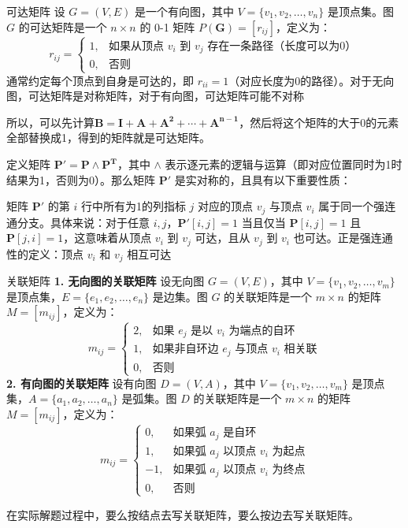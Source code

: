 \documentclass[lang=cn,11pt]{elegantbook}
\begin{document}
\begin{definition}{可达矩阵}
设 $G = (V, E)$ 是一个有向图，其中 $V = \{v_1, v_2, \ldots, v_n\}$ 是顶点集。图 $G$ 的可达矩阵是一个 $n \times n$ 的 0-1 矩阵 $P(\bm{G}) = [r_{ij}]$，定义为：
\[
r_{ij} = 
\begin{cases}
1, & \text{如果从顶点 } v_i \text{ 到 } v_j \text{ 存在一条路径（长度可以为0）} \\
0, & \text{否则}
\end{cases}
\]
通常约定每个顶点到自身是可达的，即 $r_{ii} = 1$（对应长度为0的路径）。对于无向图，可达矩阵是对称矩阵，对于有向图，可达矩阵可能不对称
\end{definition}
所以，可以先计算$\bm{B}=\bm{I}+\bm{A}+\bm{A^2}+\cdots+\bm{A^{n-1}}$，然后将这个矩阵的大于0的元素全部替换成1，得到的矩阵就是可达矩阵。

定义矩阵 $\bm{P'} = \bm{P} \land \bm{P^T}$，其中 $\land$ 表示逐元素的逻辑与运算（即对应位置同时为1时结果为1，否则为0）。那么矩阵 $\bm{P'}$ 是实对称的，且具有以下重要性质：

矩阵 $\bm{P'}$ 的第 $i$ 行中所有为1的列指标 $j$ 对应的顶点 $v_j$ 与顶点 $v_i$ 属于同一个强连通分支。具体来说：对于任意 $i,j$，$\bm{P'}[i,j] = 1$ 当且仅当 $\bm{P}[i,j] = 1$ 且 $\bm{P}[j,i] = 1$，这意味着从顶点 $v_i$ 到 $v_j$ 可达，且从 $v_j$ 到 $v_i$ 也可达。正是强连通性的定义：顶点 $v_i$ 和 $v_j$ 相互可达

\begin{definition}{关联矩阵}
\textbf{1. 无向图的关联矩阵}
设无向图 $G = (V, E)$，其中 $V = \{v_1, v_2, \ldots, v_m\}$ 是顶点集，$E = \{e_1, e_2, \ldots, e_n\}$ 是边集。图 $G$ 的关联矩阵是一个 $m \times n$ 的矩阵 $M = [m_{ij}]$，定义为：
\[
m_{ij} = 
\begin{cases}
2, & \text{如果 }e_j\text{ 是以 }v_i\text{ 为端点的自环} \\
1, & \text{如果非自环边 }e_j\text{ 与顶点 }v_i\text{ 相关联} \\
0, & \text{否则}\end{cases}
\]
\textbf{2. 有向图的关联矩阵}
设有向图 $D = (V, A)$，其中 $V = \{v_1, v_2, \ldots, v_m\}$ 是顶点集，$A = \{a_1, a_2, \ldots, a_n\}$ 是弧集。图 $D$ 的关联矩阵是一个 $m \times n$ 的矩阵 $M = [m_{ij}]$，定义为：
\[
m_{ij} = 
\begin{cases}
0, & \text{如果弧 }a_j\text{ 是自环} \\
1, & \text{如果弧 } a_j \text{ 以顶点 } v_i \text{ 为起点} \\
-1, & \text{如果弧 } a_j \text{ 以顶点 } v_i \text{ 为终点} \\
0, & \text{否则}\end{cases}
\]
\end{definition}
在实际解题过程中，要么按结点去写关联矩阵，要么按边去写关联矩阵。
\end{document}
